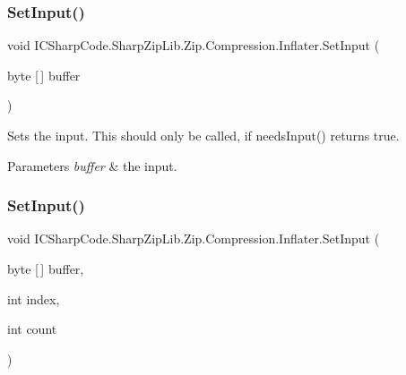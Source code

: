 \subsubsection{\texorpdfstring{Set\+Input()}{SetInput()}\hspace{0.1cm}{\footnotesize\ttfamily [1/4]}}
{\footnotesize\ttfamily void I\+C\+Sharp\+Code.\+Sharp\+Zip\+Lib.\+Zip.\+Compression.\+Inflater.\+Set\+Input (\begin{DoxyParamCaption}\item[{byte \mbox{[}$\,$\mbox{]}}]{buffer }\end{DoxyParamCaption})\hspace{0.3cm}{\ttfamily [inline]}}



Sets the input. This should only be called, if needs\+Input() returns true. 


\begin{DoxyParams}{Parameters}
{\em buffer} & the input. \\
\hline
\end{DoxyParams}
\mbox{\label{class_i_c_sharp_code_1_1_sharp_zip_lib_1_1_zip_1_1_compression_1_1_inflater_a9c0b4653fd574dc51dfa2975d9f9248a}} 
\subsubsection{\texorpdfstring{Set\+Input()}{SetInput()}\hspace{0.1cm}{\footnotesize\ttfamily [2/4]}}
{\footnotesize\ttfamily void I\+C\+Sharp\+Code.\+Sharp\+Zip\+Lib.\+Zip.\+Compression.\+Inflater.\+Set\+Input (\begin{DoxyParamCaption}\item[{byte \mbox{[}$\,$\mbox{]}}]{buffer,  }\item[{int}]{index,  }\item[{int}]{count }\end{DoxyParamCaption})\hspace{0.3cm}{\ttfamily [inline]}}



